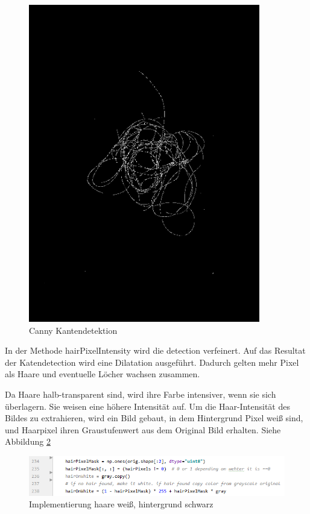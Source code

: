 \documentclass[german,a4paper,12pt]{llncs}
\begin{document}
\begin{figure}
	\centering
	\includegraphics[width=0.9\textwidth]{fig64/04edges.png}
	\caption[]{Canny Kantendetektion}
	\label{img:Edges}
\end{figure}

In der Methode hairPixelIntensity wird die detection verfeinert.
Auf das Resultat der Katendetection wird eine Dilatation ausgeführt. Dadurch gelten mehr Pixel als Haare und eventuelle Löcher wachsen zusammen.

Da Haare halb-transparent sind, wird ihre Farbe intensiver, wenn sie sich überlagern. Sie weisen eine höhere Intensität auf.
Um die Haar-Intensität des Bildes zu extrahieren, wird ein Bild gebaut, in dem Hintergrund Pixel weiß sind, und Haarpixel ihren Graustufenwert aus dem Original Bild erhalten. Siehe Abbildung \ref{q:haironwhite}

\begin{figure}
	\centering
	\includegraphics[width=1.1\textwidth]{01quellc.PNG}
	\caption[]{Implementierung haare weiß, hintergrund schwarz}
	\label{q:haironwhite}
\end{figure}
\end{document}

